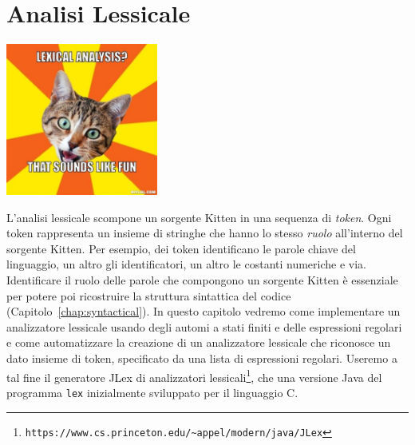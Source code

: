 \chapter{Analisi Lessicale}\label{chap:lexical}
%
\begin{center}
\includegraphics[width=5cm]{cat8.jpeg}
\end{center}
%
L'analisi lessicale scompone un sorgente Kitten in una sequenza di
\emph{token}. Ogni token rappresenta un insieme di stringhe che hanno
lo stesso \emph{ruolo} all'interno del sorgente Kitten. Per esempio, dei token
identificano le parole chiave del linguaggio, un altro gli identificatori, un
altro le costanti
numeriche e \cosi via. Identificare il ruolo delle parole che compongono
un sorgente Kitten \`e essenziale per potere poi ricostruire la struttura
sintattica del codice (Capitolo~\ref{chap:syntactical}).
In questo capitolo vedremo come implementare un analizzatore lessicale
usando degli automi a stati finiti e delle espressioni regolari
e come automatizzare la creazione di un analizzatore lessicale che
riconosce un dato insieme di token, specificato da una lista
di espressioni regolari. Useremo a tal fine il generatore JLex di
analizzatori
lessicali\footnote{\texttt{https://www.cs.princeton.edu/\~{}appel/modern/java/JLex}},
che \e una versione Java del programma
\texttt{lex} inizialmente sviluppato per il linguaggio C.
%

